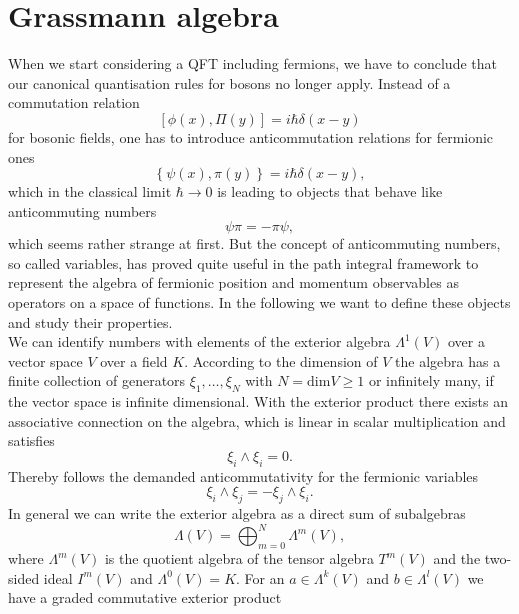 \section{Grassmann algebra}
When we start considering a QFT including fermions, we have to conclude that our canonical quantisation rules for bosons no longer apply. Instead of a commutation relation
\begin{equation}
\left[ \phi(x),\Pi(y)\right] = i \hbar \delta(x-y)
\end{equation}
for bosonic fields, one has to introduce anticommutation relations for fermionic ones \cite{Cartier:2002zp}
\begin{equation}
\left\lbrace \psi(x),\pi(y) \right\rbrace = i \hbar \delta(x-y),
\end{equation}
which in the classical limit $\hbar \rightarrow 0$ is leading to objects that behave like anticommuting numbers
\begin{equation}
\psi\pi = -\pi\psi,
\end{equation}
which seems rather strange at first. But the concept of anticommuting numbers, so called  variables, has proved quite useful in the path integral framework to represent the algebra of fermionic position and momentum observables as operators on a space of functions. In the following we want to define these objects and study their properties.\\[1cm]
%
%
We can identify  numbers with elements of the exterior algebra $\Lambda^{1}(V)$ over a vector space $V$ over a field $K$. According to the dimension of $V$ the algebra has a finite collection of generators $\xi_{1},\ldots,\xi_{N}$ with $N=\text{dim}V \geq 1$ or infinitely many, if the vector space is infinite dimensional. With the exterior product there exists an associative connection on the algebra, which is linear in scalar multiplication and satisfies
\begin{equation}
\xi_{i}\wedge \xi_{i} =0.
\label{wedge_zero}
\end{equation}
Thereby follows the demanded anticommutativity for the fermionic  variables
\begin{equation}
\xi_{i}\wedge\xi_{j} = - \xi_{j}\wedge\xi_{i}.
\end{equation}
In general we can write the exterior algebra as a direct sum of subalgebras
\begin{equation}
\Lambda(V)=\bigoplus_{m=0}^{N} \Lambda^{m}(V),
\end{equation}
where $\Lambda^{m}(V)$ is the quotient algebra of the tensor algebra $T^{m}(V)$ and the two-sided ideal $I^{m}(V)$ and $\Lambda^{0}(V)=K$. For an $a \in \Lambda^{k}(V)$ and $b \in \Lambda^{l}(V)$ we have a graded commutative exterior product
